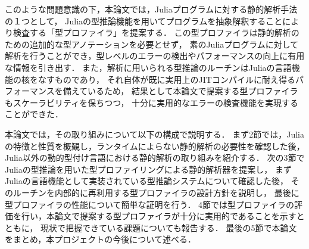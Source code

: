 このような問題意識の下，本論文では，Juliaプログラムに対する静的解析手法の１つとして，
Juliaの型推論機能を用いてプログラムを抽象解釈することにより検査する「型プロファイラ」を提案する．
この型プロファイラは静的解析のための追加的な型アノテーションを必要とせず，
素のJuliaプログラムに対して解析を行うことができ，型レベルのエラーの検出やパフォーマンスの向上に有用な情報を引き出す．
また，解析に用いられる型推論のルーチンはJuliaの言語機能の核をなすものであり，
それ自体が既に実用上のJITコンパイルに耐え得るパフォーマンスを備えているため，
結果として本論文で提案する型プロファイラもスケーラビリティを保ちつつ，
十分に実用的なエラーの検査機能を実現することができた．

本論文では，その取り組みについて以下の構成で説明する．
まず2節では，Juliaの特徴と性質を概観し，ランタイムによらない静的解析の必要性を確認した後，
Julia以外の動的型付け言語における静的解析の取り組みを紹介する．
次の3節でJuliaの型推論を用いた型プロファイリングによる静的解析器を提案し，
まずJuliaの言語機能として実装されている型推論システムについて確認した後，
そのルーチンを内部的に再利用する型プロファイラの設計方針を説明し，
最後に型プロファイラの性能について簡単な証明を行う． %
4節では型プロファイラの評価を行い，本論文で提案する型プロファイラが十分に実用的であることを示すとともに，
現状で把握できている課題についても報告する．
最後の5節で本論文をまとめ，本プロジェクトの今後について述べる．
